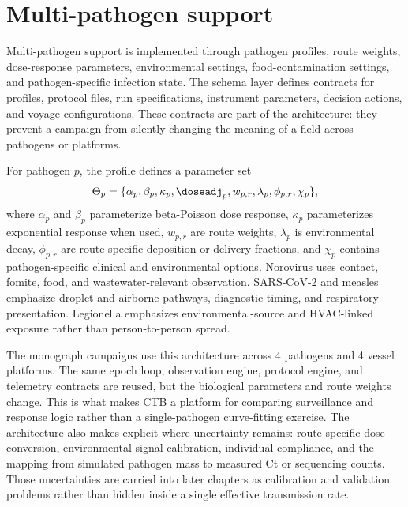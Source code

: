 \section{Multi-pathogen support}
Multi-pathogen support is implemented through pathogen profiles, route weights, dose-response parameters, environmental settings, food-contamination settings, and pathogen-specific infection
state. The schema layer defines contracts for profiles, protocol files, run specifications, instrument parameters, decision actions, and voyage configurations. These contracts are part of
the architecture: they prevent a campaign from silently changing the meaning of a field across pathogens or platforms.

For pathogen $p$, the profile defines a parameter set
\begin{equation}
\Theta_p=\{\alpha_p,\beta_p,\kappa_p,\doseadj_p,w_{p,r},\lambda_p,\phi_{p,r},\chi_p\},
\end{equation}
where $\alpha_p$ and $\beta_p$ parameterize beta-Poisson dose response, $\kappa_p$ parameterizes exponential response when used, $w_{p,r}$ are route weights, $\lambda_p$ is environmental
decay, $\phi_{p,r}$ are route-specific deposition or delivery fractions, and $\chi_p$ contains pathogen-specific clinical and environmental options. Norovirus uses contact, fomite, food, and
wastewater-relevant observation. SARS-CoV-2 and measles emphasize droplet and airborne pathways, diagnostic timing, and respiratory presentation. Legionella emphasizes environmental-source
and HVAC-linked exposure rather than person-to-person spread.

The monograph campaigns use this architecture across 4 pathogens and 4 vessel platforms. The same epoch loop, observation engine, protocol engine, and telemetry contracts are reused, but the
biological parameters and route weights change. This is what makes CTB a platform for comparing surveillance and response logic rather than a single-pathogen curve-fitting exercise. The
architecture also makes explicit where uncertainty remains: route-specific dose conversion, environmental signal calibration, individual compliance, and the mapping from simulated pathogen
mass to measured Ct or sequencing counts. Those uncertainties are carried into later chapters as calibration and validation problems rather than hidden inside a single effective transmission
rate.
